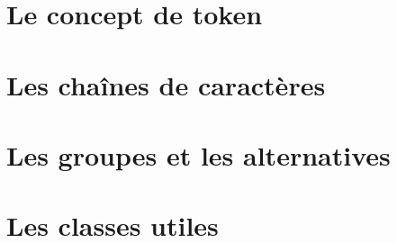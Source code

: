 \documentclass[a4paper]{article}
\begin{document}
    \section{Le concept de token}
    \section{Les chaînes de caractères}
    \section{Les groupes et les alternatives}
    \section{Les classes utiles}
\end{document}
